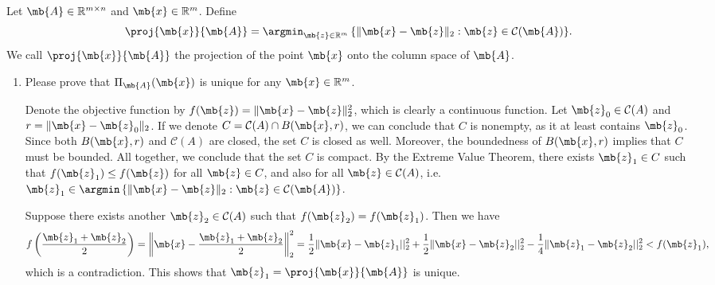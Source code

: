 \begin{exercise}[Projection ]
    Let $\mb{A}\in\mathbb{R}^{m\times n}$ and $\mb{x} \in \mathbb{R}^m$. Define
    \begin{align*}
        \proj{\mb{x}}{\mb{A}} = \argmin_{\mb{z}\in\mathbb{R}^m}\,\{\|\mb{x}-\mb{z}\|_2: \mb{z}\in\mathcal{C}(\mb{A})\}.
    \end{align*}
    We call $\proj{\mb{x}}{\mb{A}}$ the projection of the point $\mb{x}$ onto the column space of $\mb{A}$.
    \begin{enumerate}
        \item Please prove that $\Pi_{\mb{A}}(\mb{x})$ is unique for any $\mb{x} \in \mathbb{R}^m$.
            
            \begin{solution}
                Denote the objective function by $f(\mb{z})=\|\mb{x}-\mb{z}\|^2_2$, which is clearly a continuous function. 
                Let $\mb{z}_0\in\mathcal{C}(A)$ and $r = \|\mb{x}-\mb{z}_0\|_2$. 
                If we denote $C = \mathcal{C}(A) \cap B(\mb{x}, r)$, we can conclude that $C$ is nonempty, as it at least contains $\mb{z}_0$. 
                Since both $B(\mb{x}, r)$ and $\mathcal{C}(A)$ are closed, the set $C$ is closed as well. 
                Moreover, the boundedness of $B(\mb{x}, r)$ implies that $C$ must be bounded. 
                All together, we conclude that the set $C$ is compact. 
                By the Extreme Value Theorem, there exists $\mb{z}_1\in C$ such that $f(\mb{z}_1)\leq f(\mb{z})$ for all $\mb{z}\in C$, and also for all $\mb{z}\in \mathcal{C}(A)$, i.e. $\mb{z}_1 \in \argmin\,\{\|\mb{x}-\mb{z}\|_2: \mb{z}\in\mathcal{C}(\mb{A})\}$. 
                
                Suppose there exists another $\mb{z}_2 \in \mathcal{C}(A)$ such that $f(\mb{z}_2) = f(\mb{z}_1)$.
                Then we have $$f\left(\frac{\mb{z}_1+\mb{z}_2}{2}\right)=\left\|\mb{x}-\frac{\mb{z}_1+\mb{z}_2}{2}\right\|^2_2 = \frac{1}{2}\|\mb{x}-\mb{z}_1||^2_2 + \frac{1}{2}\|\mb{x}-\mb{z}_2||^2_2 - \frac{1}{4}\|\mb{z}_1-\mb{z}_2||^2_2 < f(\mb{z}_1),$$ which is a contradiction. 
                This shows that $\mb{z}_1=\proj{\mb{x}}{\mb{A}}$ is unique.
                \qedhere
            \end{solution}
            

\end{enumerate}
\end{exercise}
